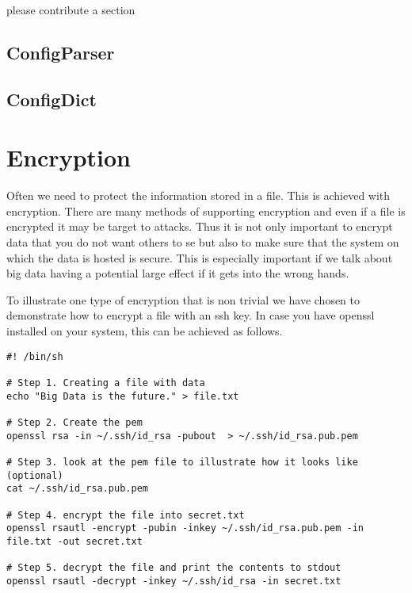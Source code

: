 please contribute a section

\subsection{ConfigParser}


\subsection{ConfigDict}


\section{Encryption}

Often we need to protect the information stored in a file. This is
achieved with encryption. There are many methods of supporting
encryption and even if a file is encrypted it may be target to
attacks. Thus it is not only important to encrypt data that you do not
want others to se but also to make sure that the system on which the
data is hosted is secure. This is especially important if we talk
about big data having a potential large effect if it gets into the
wrong hands. 

To illustrate one type of encryption that is non trivial we have
chosen to demonstrate how to encrypt a file with an ssh key. In case
you have openssl installed on your system, this can be achieved as follows.


\begin{verbatim}
#! /bin/sh

# Step 1. Creating a file with data
echo "Big Data is the future." > file.txt

# Step 2. Create the pem 
openssl rsa -in ~/.ssh/id_rsa -pubout  > ~/.ssh/id_rsa.pub.pem

# Step 3. look at the pem file to illustrate how it looks like (optional)
cat ~/.ssh/id_rsa.pub.pem

# Step 4. encrypt the file into secret.txt
openssl rsautl -encrypt -pubin -inkey ~/.ssh/id_rsa.pub.pem -in file.txt -out secret.txt

# Step 5. decrypt the file and print the contents to stdout
openssl rsautl -decrypt -inkey ~/.ssh/id_rsa -in secret.txt
\end{verbatim}

